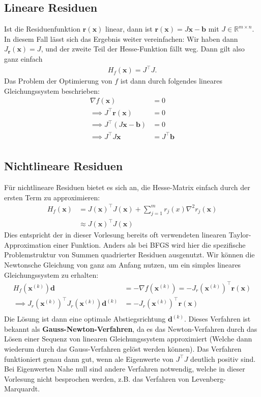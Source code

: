 \documentclass{report}
\newcommand{\tbf}{\textbf}
\newcommand{\xk}{\bm{x}^{(k)}}
\newcommand{\dk}{\bm{d}^{(k)}}
\newcommand{\Jrx}{J_{\bm{r}}(\bm{x})}
\begin{document}
\subsection{Lineare Residuen}
Ist die Residuenfunktion $\bm{r(x)}$ linear, dann ist  $\bm{r(x)} = J\bm{x} - \bm{b}$ mit $J \in \mathbb{R}^{m \times n}$. In diesem Fall lässt sich das Ergebnis weiter vereinfachen: Wir haben dann $\Jrx = J$, und der zweite Teil der Hesse-Funktion fällt weg. Dann gilt also ganz einfach
\begin{align*}
 H_f(\bm{x}) = J^\top J.
\end{align*}
Das Problem der Optimierung von $f$ ist dann durch folgendes lineares Gleichungssystem beschrieben:
\begin{align*}
 \nabla f(\bm{x}) &= 0\\
 \implies J^\top \bm{r(x)} &= 0\\
 \implies J^\top (J\bm{x} - \bm{b}) &= 0\\
  \implies J^\top J\bm{x} &= J^\top \bm{b}\\
\end{align*}
%
\subsection{Nichtlineare Residuen}
Für nichtlineare Residuen bietet es sich an, die Hesse-Matrix einfach durch der ersten Term zu approximieren:
\begin{align*}
 H_f(\bm{x}) &= J(\bm{x})^\top J(\bm{x}) + \sum_{j=1}^m r_j(x) \nabla^2 r_j(\bm{x})\\
 &\approx J(\bm{x})^\top J(\bm{x})
\end{align*}
Dies entspricht der in dieser Vorlesung bereits oft verwendeten linearen Taylor-Approximation einer Funktion. Anders als bei BFGS wird hier die spezifische Problemstruktur von Summen quadrierter Residuen ausgenutzt. Wir können die Newtonsche Gleichung von ganz am Anfang nutzen, um ein simples lineares Gleichungssystem zu erhalten:
\begin{align*}
 H_f(\xk)\bm{d} &= - \nabla f(\xk) = -J_r(\xk)^\top \bm{r(x)}\\
 \implies J_r(\xk)^\top J_r(\xk) \dk &= -J_r(\xk)^\top \bm{r(x)}\\
\end{align*}
Die Lösung ist dann eine optimale Abstiegsrichtung $\dk$. Dieses Verfahren ist bekannt als \tbf{Gauss-Newton-Verfahren}, da es das Newton-Verfahren durch das Lösen einer Sequenz von linearen Gleichungssystem approximiert (Welche dann wiederum durch das Gauss-Verfahren gelöst werden können). Das Verfahren funktioniert genau dann gut, wenn ale Eigenwerte von $J^\top J$ deutlich positiv sind. Bei Eigenwerten Nahe null sind andere Verfahren notwendig, welche in dieser Vorlesung nicht besprochen werden, z.B. das Verfahren von Levenberg-Marquardt.
%
%
%
\end{document}
